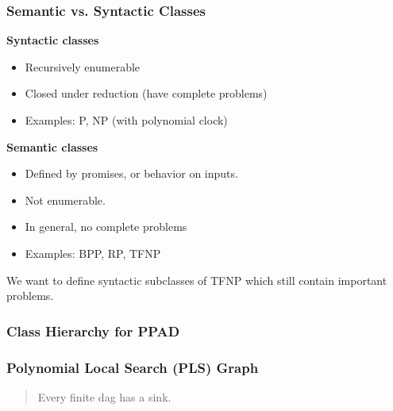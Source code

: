 \documentclass[10pt]{beamer}
\begin{document}
\begin{frame}
\frametitle{Semantic vs. Syntactic Classes}

\textbf{Syntactic classes}

\begin{itemize}
\item Recursively enumerable
\item Closed under reduction (have complete problems)
\item Examples: P, NP (with polynomial clock)
\end{itemize}

\textbf{Semantic classes}
\begin{itemize}
\item Defined by promises, or behavior on inputs.
\item Not enumerable.
\item In general, no complete problems
\item Examples: BPP, RP, TFNP
\end{itemize}

We want to define syntactic subclasses of TFNP which still contain
important problems.

\end{frame}

\begin{frame}
\frametitle{Class Hierarchy for PPAD}

\begin{figure}[hbt]
  
  \centerline{\box\graph}
\end{figure}

\end{frame}

\begin{frame}
\frametitle{Polynomial Local Search (PLS) Graph}

\begin{quote}
Every finite dag has a sink.
\end{quote}

\begin{figure}[hbt]
  
  \centerline{\box\graph}
\end{figure}

\end{frame}
\end{document}
